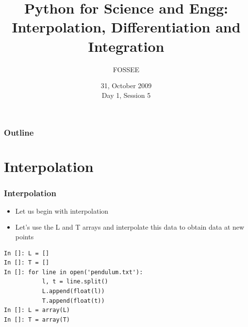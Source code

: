 \documentclass[14pt,compress]{beamer}
\title[Calculus]{Python for Science and Engg: Interpolation, Differentiation and Integration}
\author[FOSSEE] {FOSSEE}
\institute[IIT Bombay] {Department of Aerospace Engineering\\IIT Bombay}
\date[] {31, October 2009\\Day 1, Session 5}
\newcommand{\typ}[1]{\lstinline{#1}}
\begin{document}
\begin{frame}
  \titlepage
\end{frame}

\begin{frame}
  \frametitle{Outline}
  \tableofcontents
\end{frame}

\section{Interpolation}

\begin{frame}[fragile]
\frametitle{Interpolation}
\begin{itemize}
\item Let us begin with interpolation
\item Let's use the L and T arrays and interpolate this data to obtain data at new points
\end{itemize}
\begin{lstlisting}
In []: L = []
In []: T = []
In []: for line in open('pendulum.txt'):
           l, t = line.split()
           L.append(float(l))
           T.append(float(t))
In []: L = array(L)
In []: T = array(T)
\end{lstlisting}
\end{frame}


\end{document}
